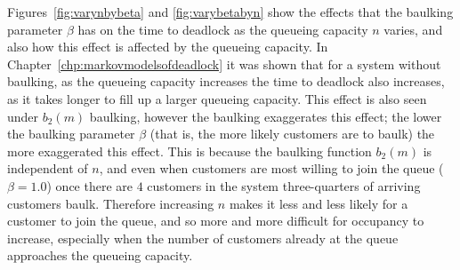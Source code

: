 \documentclass{article}
\begin{document}
Figures~\ref{fig:varynbybeta} and \ref{fig:varybetabyn} show the effects that the baulking parameter $\beta$ has on the time to deadlock as the queueing capacity $n$ varies, and also how this effect is affected by the queueing capacity.
In Chapter~\ref{chp:markovmodelsofdeadlock} it was shown that for a system without baulking, as the queueing capacity increases the time to deadlock also increases, as it takes longer to fill up a larger queueing capacity.
This effect is also seen under $b_2(m)$ baulking, however the baulking exaggerates this effect; the lower the baulking parameter $\beta$ (that is, the more likely customers are to baulk) the more exaggerated this effect.
This is because the baulking function $b_2(m)$ is independent of $n$, and even when customers are most willing to join the queue ($\beta = 1.0$) once there are $4$ customers in the system three-quarters of arriving customers baulk.
Therefore increasing $n$ makes it less and less likely for a customer to join the queue, and so more and more difficult for occupancy to increase, especially when the number of customers already at the queue approaches the queueing capacity.
\end{document}
